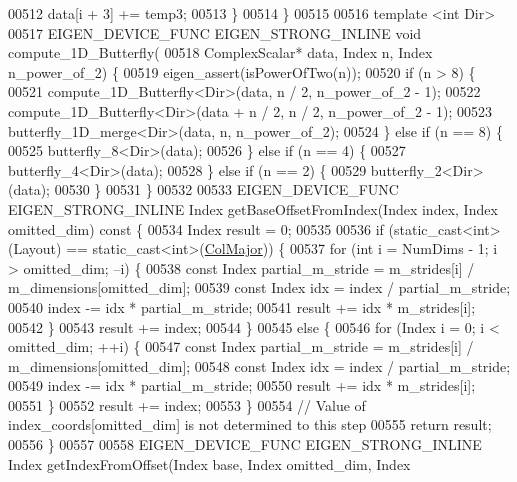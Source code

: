\begin{DoxyCode}
00512        data[i + 3] += temp3;
00513     \}
00514   \}
00515 
00516  \textcolor{keyword}{template} <\textcolor{keywordtype}{int} Dir>
00517   EIGEN\_DEVICE\_FUNC EIGEN\_STRONG\_INLINE \textcolor{keywordtype}{void} compute\_1D\_Butterfly(
00518       ComplexScalar* data, Index n, Index n\_power\_of\_2) \{
00519     eigen\_assert(isPowerOfTwo(n));
00520     \textcolor{keywordflow}{if} (n > 8) \{
00521       compute\_1D\_Butterfly<Dir>(data, n / 2, n\_power\_of\_2 - 1);
00522       compute\_1D\_Butterfly<Dir>(data + n / 2, n / 2, n\_power\_of\_2 - 1);
00523       butterfly\_1D\_merge<Dir>(data, n, n\_power\_of\_2);
00524     \} \textcolor{keywordflow}{else} \textcolor{keywordflow}{if} (n == 8) \{
00525       butterfly\_8<Dir>(data);
00526     \} \textcolor{keywordflow}{else} \textcolor{keywordflow}{if} (n == 4) \{
00527       butterfly\_4<Dir>(data);
00528     \} \textcolor{keywordflow}{else} \textcolor{keywordflow}{if} (n == 2) \{
00529       butterfly\_2<Dir>(data);
00530     \}
00531   \}
00532 
00533   EIGEN\_DEVICE\_FUNC EIGEN\_STRONG\_INLINE Index getBaseOffsetFromIndex(Index index, Index omitted\_dim)\textcolor{keyword}{ const }
      \{
00534     Index result = 0;
00535 
00536     \textcolor{keywordflow}{if} (static\_cast<int>(Layout) == static\_cast<int>(\hyperlink{group__enums_ggaacded1a18ae58b0f554751f6cdf9eb13a0cbd4bdd0abcfc0224c5fcb5e4f6669a}{ColMajor})) \{
00537       \textcolor{keywordflow}{for} (\textcolor{keywordtype}{int} i = NumDims - 1; i > omitted\_dim; --i) \{
00538         \textcolor{keyword}{const} Index partial\_m\_stride = m\_strides[i] / m\_dimensions[omitted\_dim];
00539         \textcolor{keyword}{const} Index idx = index / partial\_m\_stride;
00540         index -= idx * partial\_m\_stride;
00541         result += idx * m\_strides[i];
00542       \}
00543       result += index;
00544     \}
00545     \textcolor{keywordflow}{else} \{
00546       \textcolor{keywordflow}{for} (Index i = 0; i < omitted\_dim; ++i) \{
00547         \textcolor{keyword}{const} Index partial\_m\_stride = m\_strides[i] / m\_dimensions[omitted\_dim];
00548         \textcolor{keyword}{const} Index idx = index / partial\_m\_stride;
00549         index -= idx * partial\_m\_stride;
00550         result += idx * m\_strides[i];
00551       \}
00552       result += index;
00553     \}
00554     \textcolor{comment}{// Value of index\_coords[omitted\_dim] is not determined to this step}
00555     \textcolor{keywordflow}{return} result;
00556   \}
00557 
00558   EIGEN\_DEVICE\_FUNC EIGEN\_STRONG\_INLINE Index getIndexFromOffset(Index base, Index omitted\_dim, Index 

\end{DoxyCode}
